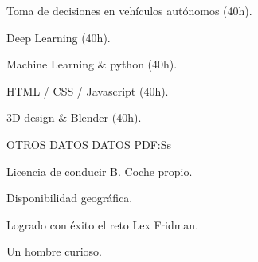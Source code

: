 \documentclass[letterpaper,MMMyyyy,nonstopmode]{simpleresumecv}
\begin{document}
\begin{Body}
\Gap

Toma de decisiones en vehículos autónomos (40h).

\Gap

Deep Learning (40h).

\Gap

Machine Learning \& python (40h).

\Gap

HTML / CSS / Javascript (40h).


\Gap

3D design \& Blender (40h).


\Gap

\hfill


\Section
{OTROS DATOS}
{DATOS }
{PDF:Ss}

\Entry

Licencia de conducir B. Coche propio.

\Gap

Disponibilidad geográfica.

\Gap

Logrado con éxito el reto Lex Fridman.

\Gap

Un hombre curioso.


\end{Body}

\end{document}

